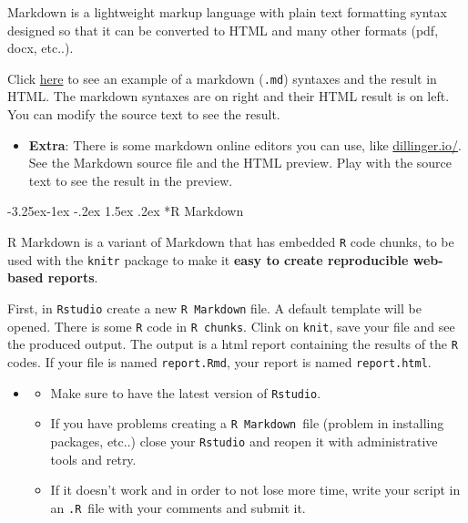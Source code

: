 \documentclass[]{book}
\makeatletter
\providecommand{\tightlist}{%
  \setlength{\itemsep}{0pt}\setlength{\parskip}{0pt}}
\newenvironment{rmdblock}[1]
  {\begin{shaded*}
  \begin{itemize}
  \renewcommand{\labelitemi}{
    \raisebox{-.7\height}[0pt][0pt]{
      {\setkeys{Gin}{width=2em,keepaspectratio}\texttt{[image: img/icons/\#1]}}
    }
  }
  \item
  }
  {
  \end{itemize}
  \end{shaded*}
  }
\newenvironment{rmdcaution}
  {\begin{rmdblock}{caution}}
  {\end{rmdblock}}
\newenvironment{rmdtip}
  {\begin{rmdblock}{tip}}
  {\end{rmdblock}}
\renewcommand\subsection{\@startsection{subsection}{2}{\z@}%
                                     {-3.25ex\@plus -1ex \@minus -.2ex}%
                                     {1.5ex \@plus .2ex}%
                                     {\normalfont\large\bfseries\color{Violet}}}
\theoremstyle{definition}
\theoremstyle{definition}
\theoremstyle{definition}
\theoremstyle{remark}
\makeatother
\begin{document}
Markdown is a lightweight markup language with plain text formatting
syntax designed so that it can be converted to HTML and many other
formats (pdf, docx, etc..).

Click \href{http://agea.github.io/tutorial.md/}{here} to see an example
of a markdown (\texttt{.md}) syntaxes and the result in HTML. The
markdown syntaxes are on right and their HTML result is on left. You can
modify the source text to see the result.

\begin{rmdtip}
\textbf{Extra}: There is some markdown online editors you can use, like
\href{http://dillinger.io/}{dillinger.io/}. See the Markdown source file
and the HTML preview. Play with the source text to see the result in the
preview.
\end{rmdtip}

\subsection*{R Markdown}\label{r-markdown}

R Markdown is a variant of Markdown that has embedded \texttt{R} code
chunks, to be used with the \texttt{knitr} package to make it
\textbf{easy to create reproducible web-based reports}.

First, in \texttt{Rstudio} create a new \texttt{R\ Markdown} file. A
default template will be opened. There is some \texttt{R} code in
\texttt{R\ chunks}. Clink on \texttt{knit}, save your file and see the
produced output. The output is a html report containing the results of
the \texttt{R} codes. If your file is named \texttt{report.Rmd}, your
report is named \texttt{report.html}.

\begin{rmdcaution}
\begin{itemize}
\tightlist
\item
  Make sure to have the latest version of \texttt{Rstudio}.
\item
  If you have problems creating a \texttt{R\ Markdown}~file (problem in
  installing packages, etc..) close your \texttt{Rstudio} and reopen it
  with administrative tools and retry.
\item
  If it doesn't work and in order to not lose more time, write your
  script in an \texttt{.R}~file with your comments and submit it.
\end{itemize}
\end{rmdcaution}
\end{document}
